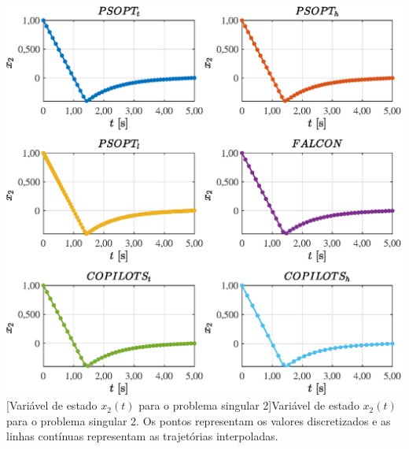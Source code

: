 \noindent
\begin{minipage}{\textwidth}
	\vspace{\onelineskip}
	\centering
	\includegraphics[scale=0.70]{fig/resultados/singular2/traj/x/x_2}
	[Variável de estado $x_2(t)$ para o problema singular 2]{Variável de estado $x_2(t)$ para o problema singular 2. Os pontos representam os valores discretizados e as linhas contínuas representam as trajetórias interpoladas.}
	\label{fig:singular2:x:x2}
	\vspace{\onelineskip}
\end{minipage}

